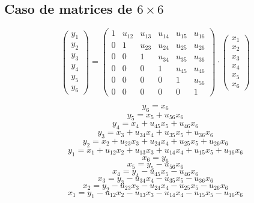 \documentclass[10pt,a4paper,dvipdfmx]{article}
\begin{document}
\subsection{Caso de matrices de $6\times 6$ }
$$ \left( 
\begin{array}{c}
y_{1} \\
y_{2} \\
y_{3} \\
y_{4} \\
y_{5} \\
y_{6} 
 \end{array}
\right)
 = \left( 
\begin{array}{cccccc}
1 & u_{{1}{2}} & u_{{1}{3}} & u_{{1}{4}} & u_{{1}{5}} & u_{{1}{6}} \\
0 & 1 & u_{{2}{3}} & u_{{2}{4}} & u_{{2}{5}} & u_{{2}{6}} \\
0 & 0 & 1 & u_{{3}{4}} & u_{{3}{5}} & u_{{3}{6}} \\
0 & 0 & 0 & 1 & u_{{4}{5}} & u_{{4}{6}} \\
0 & 0 & 0 & 0 & 1 & u_{{5}{6}} \\
0 & 0 & 0 & 0 & 0 & 1 
 \end{array}
\right)
 \cdot \left( 
\begin{array}{c}
x_{1} \\
x_{2} \\
x_{3} \\
x_{4} \\
x_{5} \\
x_{6} 
 \end{array}
\right)
 $$
\begin{multicols}{2}
$$ y_{6} = x_{6} $$
$$ y_{5} = x_{5} + u_{{5}{6}} x_{6} $$
$$ y_{4} = x_{4} + u_{{4}{5}} x_{5} + u_{{4}{6}} x_{6} $$
$$ y_{3} = x_{3} + u_{{3}{4}} x_{4} + u_{{3}{5}} x_{5} + u_{{3}{6}} x_{6} $$
$$ y_{2} = x_{2} + u_{{2}{3}} x_{3} + u_{{2}{4}} x_{4} + u_{{2}{5}} x_{5} + u_{{2}{6}} x_{6} $$
$$ y_{1} = x_{1} + u_{{1}{2}} x_{2} + u_{{1}{3}} x_{3} + u_{{1}{4}} x_{4} + u_{{1}{5}} x_{5} + u_{{1}{6}} x_{6} $$
\vfill\null
\columnbreak
$$ x_{6} = y_{6} $$
$$ x_{5} = y_{5}- u_{{5}{6}} x_{6} $$
$$ x_{4} = y_{4}- u_{{4}{5}} x_{5}- u_{{4}{6}} x_{6} $$
$$ x_{3} = y_{3}- u_{{3}{4}} x_{4}- u_{{3}{5}} x_{5}- u_{{3}{6}} x_{6} $$
$$ x_{2} = y_{2}- u_{{2}{3}} x_{3}- u_{{2}{4}} x_{4}- u_{{2}{5}} x_{5}- u_{{2}{6}} x_{6} $$
$$ x_{1} = y_{1}- u_{{1}{2}} x_{2}- u_{{1}{3}} x_{3}- u_{{1}{4}} x_{4}- u_{{1}{5}} x_{5}- u_{{1}{6}} x_{6} $$
\end{multicols}
\end{document}
